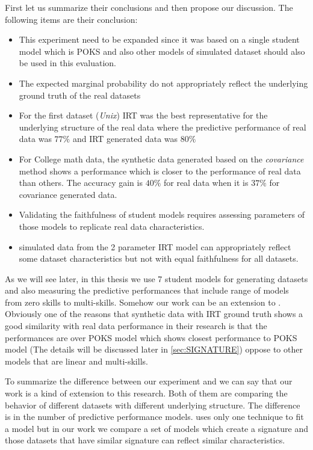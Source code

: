 First let us summarize their conclusions and then propose our discussion. The following items are their conclusion:
\begin{itemize}
\item This experiment need to be expanded since it was based on a single student model which is POKS and also other models of simulated dataset should also be used in this evaluation.
\item The expected marginal probability do not appropriately reflect the underlying ground truth of the real datasets
\item For the first dataset (\textit{Unix}) IRT was the best representative for the underlying structure of the real data where the predictive performance of real data was $77\%$ and IRT generated data was $80\%$
\item For College math data, the synthetic data generated based on the \textit{covariance} method shows a performance which is closer to the performance of real data than others. The accuracy gain is $40\%$ for real data when it is $37\%$ for covariance generated data.

\item Validating the faithfulness of student models requires assessing parameters of those models to replicate real data characteristics.

\item simulated data from the 2 parameter IRT model can appropriately reflect some dataset characteristics but not with equal faithfulness for all datasets.
 
\end{itemize}

As we will see later, in this thesis we use 7 student models for generating datasets and also measuring the predictive performances that include range of models from zero skills to multi-skills. Somehow our work can be an extension to \citep{Desmarais2010}. Obviously one of the reasons that synthetic data with IRT ground truth shows a good similarity with real data performance in their research is that the performances are over POKS model which shows closest performance to POKS model (The details will be discussed later in \ref{sec:SIGNATURE}) oppose to other models that are linear and multi-skills. 

To summarize the difference between our experiment and \citep{Desmarais2010} we can say that our work is a kind of extension to this research. Both of them are comparing the behavior of different datasets with different underlying structure. The difference is in the number of predictive performance models. \citet{Desmarais2010} uses only one technique to fit a model but in our work we compare a set of models which create a signature and those datasets that have similar signature can reflect similar characteristics.


